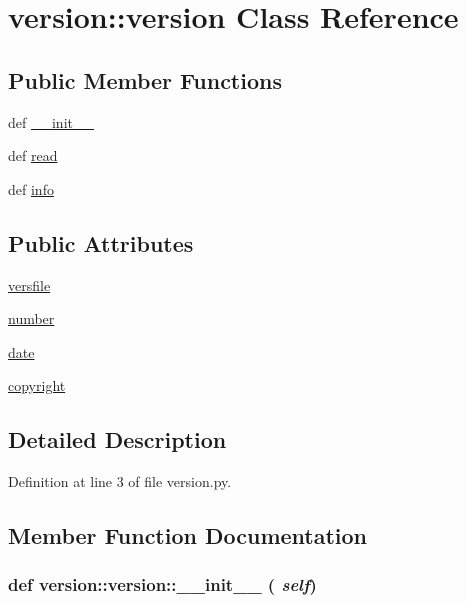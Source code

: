 \hypertarget{classversion_1_1version}{
\section{version::version Class Reference}
\label{classversion_1_1version}
}
\subsection*{Public Member Functions}
\begin{DoxyCompactItemize}
\item 
def \hyperlink{classversion_1_1version_a7c9925e88fe2daf87a15de7b9a6f785b}{\_\-\_\-init\_\-\_\-}
\item 
def \hyperlink{classversion_1_1version_ac4231b167690c0cbc57a6bb9a3a12a9f}{read}
\item 
def \hyperlink{classversion_1_1version_a9b2a04cf6c7accb654a20c992eda01a3}{info}
\end{DoxyCompactItemize}
\subsection*{Public Attributes}
\begin{DoxyCompactItemize}
\item 
\hyperlink{classversion_1_1version_ac8aa5f4a7b6d0c1119f87488296fdb15}{versfile}
\item 
\hyperlink{classversion_1_1version_aae0cbe7734a585046f80415c90f7bdb0}{number}
\item 
\hyperlink{classversion_1_1version_ac0217c7361fc9a925fa51c58610dfc69}{date}
\item 
\hyperlink{classversion_1_1version_aa401bc80238c2e5f09faf35940a49343}{copyright}
\end{DoxyCompactItemize}


\subsection{Detailed Description}


Definition at line 3 of file version.py.

\subsection{Member Function Documentation}
\hypertarget{classversion_1_1version_a7c9925e88fe2daf87a15de7b9a6f785b}{
\subsubsection[{\_\-\_\-init\_\-\_\-}]{\setlength{\rightskip}{0pt plus 5cm}def version::version::\_\-\_\-init\_\-\_\- ( {\em self})}}
\label{classversion_1_1version_a7c9925e88fe2daf87a15de7b9a6f785b}


